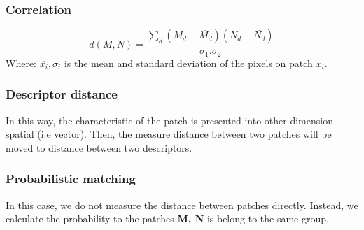 \subsubsection{Correlation}
\begin{equation}\label{correlation}
	d(M,N) = \frac{\sum_d(M_d - \overline{M_d})(N_d - \overline{N_d})}{\sigma_1.\sigma_2}
\end{equation}
Where: $\overline{x_i}, \sigma_i$ is the mean and standard deviation of the pixels on patch $x_i$.
\subsubsection{Descriptor distance}
In this way, the characteristic of the patch is presented into other dimension spatial (i.e vector). Then, the measure distance between two patches will be moved to distance between two descriptors.
\subsubsection{Probabilistic matching}
In this case, we do not measure the distance between patches directly. Instead, we calculate the probability to the patches \textbf{M, N} is belong to the same group.
